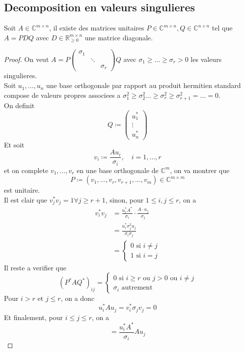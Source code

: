 \documentclass[../main.tex]{subfiles}
\begin{document}
\subsection{Decomposition en valeurs singulieres}
\begin{thm}
	Soit $A \in \mathbb{C}^{m\times n}$, il existe des matrices unitaires $P \in \mathbb{C}^{m\times n}, Q \in \mathbb{C}^{n \times n}$ tel que $A= P D Q$ avec $D \in \mathbb{R}_{ \geq 0} ^{m\times n}$ une matrice diagonale.
\end{thm}
\begin{proof}
On veut $A = P 
\begin{pmatrix}
	\sigma_1 & & \\
		 & \ddots & \\
		 & & \sigma_r
\end{pmatrix} Q$ avec $\sigma_1 \geq \ldots \geq \sigma_r >0$ les valeurs singulieres.\\
Soit $u_1,\ldots, u_n$ une base orthogonale par rapport au produit hermitien standard compose de valeurs propres associees a $\sigma_{1}^{2} \geq \sigma_2^{2} \ldots \geq  \sigma_r^{2} \geq \sigma_{r+1} ^{2} = \ldots =0  $. \\
On definit 
\[ 
Q \coloneqq 
\begin{pmatrix}
u_1^{*}\\ \vdots \\ u_n^{*}
\end{pmatrix} 
\]
Et soit
\[ 
v_i \coloneqq  \frac{A u_i}{\sigma_i}, \quad  i=1,\ldots,r
\]
et on complete $v_1, \ldots, v_r$ en une base orthogonale de $\mathbb{C}^{m}$, on va montrer que 
\[ 
	P \coloneqq ( v_1, \ldots, v_r, v_{r+1} , \ldots,v_m) \in \mathbb{C}^{m\times m}
\]
est unitaire.\\
Il est clair que $v_j^{*}v_j = 1\forall j \geq r+1$, sinon, pour $1 \leq i,j \leq  r$, on a
\begin{align*}
	v_i^{* }v_j &= \frac{u_i^{*}A^{*}}{\sigma_i} \cdot \frac{A \cdot u_j}{\sigma_j} \\
	&= \frac{u_i^{*}\sigma_j^{2} u_j}{\sigma_i\sigma_j}\\
	&=
	\begin{cases}
	0 \text{ si } i \neq j\\
	1 \text{ si } i=j
	\end{cases}
\end{align*}
Il reste a verifier que
\[ 
( P^{*} A Q^{*} )_{ij} = 
\begin{cases}
	0 \text{ si }  i \geq r \text{ ou } j > 0 \text{ ou  } i\neq j\\
	\sigma_i \text{ autrement } 
\end{cases}
\]
Pour $i>r$ et $j \leq r$, on a donc
\[ 
u_i^{*}A u_j = v_i^{*} \sigma_j v_j = 0
\]
Et finalement, pour $i \leq j \leq r$, on a 
\[ 
= \frac{u_i^{*}A^{*}}{\sigma_i}A u_j 
\]
\end{proof}
\end{document}
